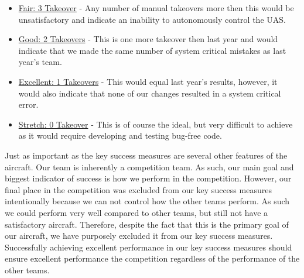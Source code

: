 \documentclass[]{auvsi_doc}
\begin{document}
\begin{itemize}
	\begin{itemize}
	\item  \underline{Fair: 3 Takeover} -  Any number of manual takeovers more then this would be unsatisfactory and indicate an inability to autonomously control the UAS.
	\item \underline{Good: 2 Takeovers} -  This is one more takeover then last year and would indicate that we made the same number of system critical mistakes as last year's team. 
	\item \underline{Excellent: 1 Takeovers} -  This would equal last year's results, however, it would also indicate that none of our changes resulted in a system critical error.
	\item \underline{Stretch: 0 Takeover} - This is of course the ideal, but very difficult to achieve as it would require developing and testing bug-free code.
	\end{itemize}
\end{itemize}

Just as important as the key success measures are several other features of the aircraft. Our team is inherently a competition team. As such, our main goal and biggest indicator of success is how we perform in the competition. However, our final place in the competition was excluded from our key success measures intentionally because we can not control how the other teams perform. As such we could perform very well compared to other teams, but still not have a satisfactory aircraft. Therefore, despite the fact that this is the primary goal of our aircraft, we have purposely excluded it from our key success measures. Successfully achieving excellent performance in our key success measures should ensure excellent performance the competition regardless of the performance of the other teams.
\end{document}
